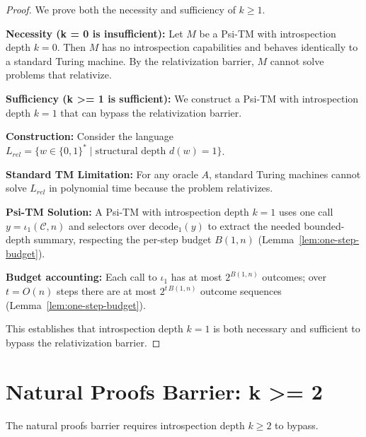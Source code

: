 \begin{proof}
We prove both the necessity and sufficiency of $k \geq 1$.

\textbf{Necessity (k = 0 is insufficient):}
Let $M$ be a Psi-TM with introspection depth $k = 0$. Then $M$ has no introspection capabilities and behaves identically to a standard Turing machine. By the relativization barrier, $M$ cannot solve problems that relativize.

\textbf{Sufficiency (k >= 1 is sufficient):}
We construct a Psi-TM with introspection depth $k = 1$ that can bypass the relativization barrier.

\textbf{Construction:}
Consider the language $L_{rel} = \{w \in \{0,1\}^* \mid \text{structural depth } d(w) = 1\}$.

\textbf{Standard TM Limitation:}
For any oracle $A$, standard Turing machines cannot solve $L_{rel}$ in polynomial time because the problem relativizes.

\textbf{Psi-TM Solution:}
A Psi-TM with introspection depth $k = 1$ uses one call $y=\iota_1(\mathcal{C},n)$ and selectors over $\mathrm{decode}_1(y)$ to extract the needed bounded-depth summary, respecting the per-step budget $B(1,n)$ (Lemma~\ref{lem:one-step-budget}).

\textbf{Budget accounting:}
Each call to $\iota_1$ has at most $2^{B(1,n)}$ outcomes; over $t=O(n)$ steps there are at most $2^{t\,B(1,n)}$ outcome sequences (Lemma~\ref{lem:one-step-budget}).

This establishes that introspection depth $k = 1$ is both necessary and sufficient to bypass the relativization barrier.
\end{proof}

\section{Natural Proofs Barrier: k >= 2}

\begin{theorem}
The natural proofs barrier requires introspection depth $k \geq 2$ to bypass.
\end{theorem}


